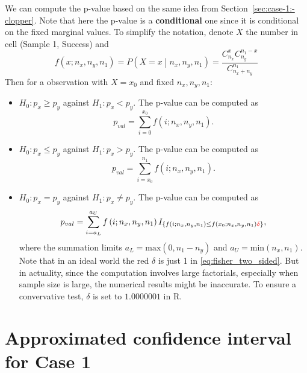 \documentclass[a4paper,12pt]{article}
\begin{document}
We can compute the p-value based on the same idea from Section~\ref{sec:case-1:-clopper}. Note that here the p-value is a \textbf{conditional} one since it is conditional on the fixed marginal values. To simplify the notation, denote $X$ the number in cell (Sample 1, Success) and
\[
  f\left(x; n_x, n_y, n_1\right)
  = P\left(
    X = x\middle| n_x, n_y, n_1
  \right)
  = \frac{C_{n_x}^xC_{n_y}^{n_1 - x}}{C_{n_x + n_y}^{n_1}}
\]
Then for a observation with $X = x_0$ and fixed $n_x, n_y, n_1$:
\begin{itemize}
\item $H_0: p_x \geq p_y$ against $H_1: p_x < p_y$. The p-value can be computed as
  \begin{equation}
    \label{eq:fisher_one_sided_geq}
    p_{val} = \sum\limits_{i = 0}^{x_0}f\left(i;n_x, n_y, n_1\right)
    .
  \end{equation}
\item $H_0: p_x \leq p_y$ against $H_1: p_x > p_y$. The p-value can be computed as
  \begin{equation}
    \label{eq:fisher_one_sided_leq}
    p_{val} = \sum\limits_{i = x_0}^{n_1}f\left(i; n_x, n_y, n_1\right)
    .
  \end{equation}
\item $H_0: p_x = p_y$ against $H_1: p_x\neq p_y$. The p-value can be computed as
  \begin{equation}
    \label{eq:fisher_two_sided}
    p_{val} = \sum\limits_{i = a_L}^{a_U}
    f\left(i;n_x, n_y, n_1\right)
    I_{\left\{
        f\left(i;n_x, n_y, n_1\right)
        \leq f\left(x_0;n_x, n_y, n_1\right){\color{red}\delta}
      \right\}}
    ,
  \end{equation}
  where the summation limits $a_L = \mathrm{max}\left(0, n_1 - n_y\right)$ and $a_U = \mathrm{min}\left(n_x, n_1\right)$. Note that in an ideal world the {\color{red} red $\delta$} is just 1 in \eqref{eq:fisher_two_sided}. But in actuality, since the computation involves large factorials, especially when sample size is large, the numerical results might be inaccurate. To ensure a convervative test, $\delta$ is set to $1.0000001$ in R\citep{Helwig2020p-}.
\end{itemize}

\section{Approximated confidence interval for Case 1}
\label{sec:appr-conf-interv}
\end{document}
